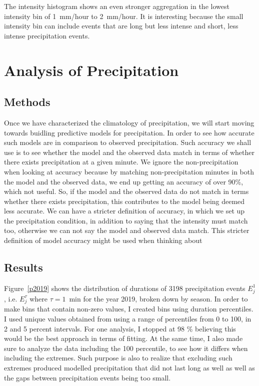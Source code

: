 \documentclass[11pt]{report}
\begin{document}
The intensity histogram shows an even stronger aggregation in the lowest
intensity bin of 1~mm/hour to 2~mm/hour. It is interesting because the small
intensity bin can include events that are long but less intense and short,
less intense precipitation events.

\section{Analysis of Precipitation}\label{sec:apc}


\subsection{Methods}\label{sec:methods}

Once we have characterized the climatology of precipitation, we will start
moving towards buidling predictive models for precipitation. In order to see
how accurate such models are in comparison to observed precipitation. Such
accuracy we shall use is to see whether the model and the observed data
match in terms of whether there exists precipitation at a given minute. We
ignore the non-precipitation when looking at accuracy because by matching
non-precipitation minutes in both the model and the observed data, we end up
getting an accuracy of over 90\%, which not useful. So, if the model and the
observed data do not match in terms whether there exists precipitation, this
contributes to the model being deemed less accurate. We can have a stricter
definition of accuracy, in which we set up the precipitation condition, in
addition to saying that the intensity must match too, otherwise we can not
say the model and observed data match. This stricter definition of model
accuracy might be used when thinking about

\subsection{Results}\label{sec:apcr}

Figure~\ref{p2019} shows the distribution of durations of 3198 precipitation
events $E_j^1$, i.e. $E_j^\tau$ where $\tau=1$~min for the year 2019, broken
down by season. In order to make bins that contain non-zero values, I
created bins using duration percentiles. I used unique values obtained from
using a range of percentiles from 0 to 100, in 2 and 5 percent
intervals. For one analysis, I stopped at 98 \% believing this would be the
best approach in terms of fitting. At the same time, I also made sure to
analyze the data including the 100 percentile, to see how it differs when
including the extremes. Such purpose is also to realize that excluding such
extremes produced modelled precipitation that did not last long as well as
well as the gaps between precipitation events being too small.
\end{document}
